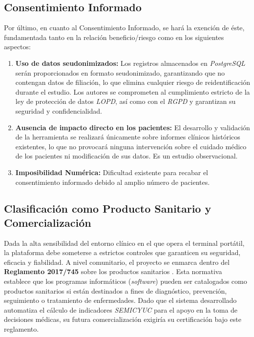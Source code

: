 \subsection{Consentimiento Informado}
Por último, en cuanto al Consentimiento Informado, se hará la exención de éste, fundamentada tanto en la relación beneficio/riesgo como en los siguientes aspectos: 
\begin{enumerate}
    \item \textbf{Uso de datos seudonimizados:} Los registros almacenados en \textit{PostgreSQL} serán proporcionados en formato seudonimizado, garantizando que no contengan datos de filiación, lo que elimina cualquier riesgo de reidentificación durante el estudio. Los autores se comprometen al cumplimiento estricto de la ley de protección de datos \textit{LOPD}, así como con el \textit{RGPD} y garantizan su seguridad y confidencialidad.
    \item \textbf{Ausencia de impacto directo en los pacientes:} El desarrollo y validación de la herramienta se realizará únicamente sobre informes clínicos históricos existentes, lo que no provocará ninguna intervención sobre el cuidado médico de los pacientes ni modificación de sus datos. Es un estudio observacional.
    \item \textbf{Imposibilidad Numérica:} Dificultad  existente para recabar el consentimiento informado debido al amplio número de pacientes.
\end{enumerate} 

\subsection{Clasificación como Producto Sanitario y Comercialización}

Dada la alta sensibilidad del entorno clínico en el que opera el terminal portátil, la plataforma debe someterse a estrictos controles que garanticen su seguridad, eficacia y fiabilidad. A nivel comunitario, el proyecto se enmarca dentro del \textbf{Reglamento 2017/745} sobre los productos sanitarios \cite{boe2017/745}. Esta normativa establece que los programas informáticos (\textit{software}) pueden ser catalogados como productos sanitarios si están destinados a fines de diagnóstico, prevención, seguimiento o tratamiento de enfermedades. Dado que el sistema desarrollado automatiza el cálculo de indicadores \textit{SEMICYUC} para el apoyo en la toma de decisiones médicas, su futura comercialización exigiría su certificación bajo este reglamento.

